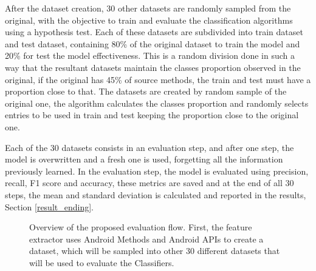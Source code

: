After the dataset creation, 30 other datasets are randomly sampled from the original, with the objective to train and evaluate the classification algorithms using a hypothesis test. Each of these datasets are subdivided into train dataset and test dataset, containing 80\% of the original dataset to train the model and 20\% for test the model effectiveness. This is a random division done in such a way that the resultant datasets maintain the classes proportion observed in the original, if the original has 45\% of source methods, the train and test must have a proportion close to that. The datasets are created by random sample of the original one, the algorithm calculates the classes proportion and randomly selects entries to be used in train and test keeping the proportion close to the original one.

Each of the 30 datasets consists in an evaluation step, and after one step, the model is overwritten and a fresh one is used, forgetting all the information previously learned. In the evaluation step, the model is evaluated using precision, recall, F1 score and accuracy, these metrics are saved and at the end of all 30 steps, the mean and standard deviation is calculated and reported in the results, Section \ref{result_ending}.


\begin{figure}[!h]
    \begin{center}
        
    \end{center}
    \caption{%
        Overview of the proposed evaluation flow. First, the feature extractor uses Android Methods and %
        Android APIs to create a dataset, which will be sampled into other 30 different datasets that will be used %
        to evaluate the Classifiers.%
    }\label{figure:flow}
\end{figure}

